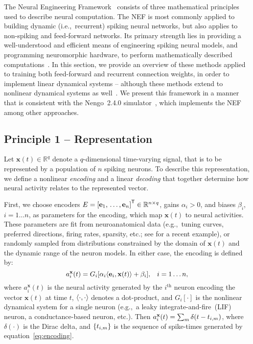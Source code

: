 \documentclass[12pt]{article}
\theoremstyle{definition}
\renewcommand{\vec}{\mathbf}  %
\newcommand{\transpose}[1]{{#1}^\mathsf{T}}
\let\originalleft\left
\let\originalright\right
\renewcommand{\left}{\mathopen{}\mathclose\bgroup\originalleft}
\renewcommand{\right}{\aftergroup\egroup\originalright}
\begin{document}
The Neural Engineering Framework~\citep[NEF;][]{eliasmith1999developing, eliasmith2003neural} consists of three mathematical principles used to describe neural computation.
The NEF is most commonly applied to building dynamic (i.e.,~recurrent) spiking neural networks, but also applies to non-spiking and feed-forward networks.
Its primary strength lies in providing a well-understood and efficient means of engineering spiking neural models, and programming neuromorphic hardware, to perform mathematically described computations~\citep{eliasmith2013build, boahen2017neuromorph}.
In this section, we provide an overview of these methods applied to training both feed-forward and recurrent connection weights, in order to implement linear dynamical systems -- although these methods extend to nonlinear dynamical systems as well~\citep{voelker2017iscas, voelker2017neuromorphic}.
We present this framework in a manner that is consistent with the Nengo~2.4.0 simulator~\citep{bekolay2013nengo}, which implements the NEF among other approaches.

\subsection{Principle 1 -- Representation}

Let $\vec{x}(t) \in \mathbb{R}^q$ denote a $q$-dimensional time-varying signal, that is to be represented by a population of $n$ spiking neurons.
To describe this representation, we define a nonlinear \emph{encoding} and a linear \emph{decoding} that together determine how neural activity relates to the represented vector.

First, we choose encoders $E = \transpose{\left[ \vec{e}_1\text{,}\, \ldots\text{,}\, \vec{e}_n \right]} \in \mathbb{R}^{n \times q}$, gains $\alpha_i > 0$, and biases $\beta_i$, $i = 1 \ldots n$, as parameters for the encoding, which map $\vec{x}(t)$ to neural activities.
These parameters are fit from neuroanatomical data (e.g.,~tuning curves, preferred directions, firing rates, sparsity, etc.; see \citet{voelker2016a} for a recent example), or randomly sampled from distributions constrained by the domain of $\vec{x}(t)$ and the dynamic range of the neuron models.
In either case, the encoding is defined by:
\begin{equation} \label{eq:encoding}
a_i^\vec{x}(t) = G_i \left[ \alpha_i \left\langle \vec{e}_i, \vec{x}(t) \right\rangle + \beta_i \right] \text{,} \quad i = 1 \ldots n \text{,}
\end{equation}
where $a_i^\vec{x}(t)$ is the neural activity generated by the $i^{\text{th}}$ neuron encoding the vector $\vec{x}(t)$ at time $t$, $\left\langle \cdot , \cdot \right\rangle$ denotes a dot-product, and $G_i[\cdot]$ is the nonlinear dynamical system for a single neuron (e.g.,~a leaky integrate-and-fire~(LIF) neuron, a conductance-based neuron, etc.).
Then $a_i^\vec{x}(t) = \sum_m \delta \left(t - t_{i\text{,}m} \right)$, where $\delta(\cdot)$ is the Dirac delta, and $\left\{ t_{i\text{,}m} \right\}$ is the sequence of spike-times generated by equation~\ref{eq:encoding}. %
\end{document}
